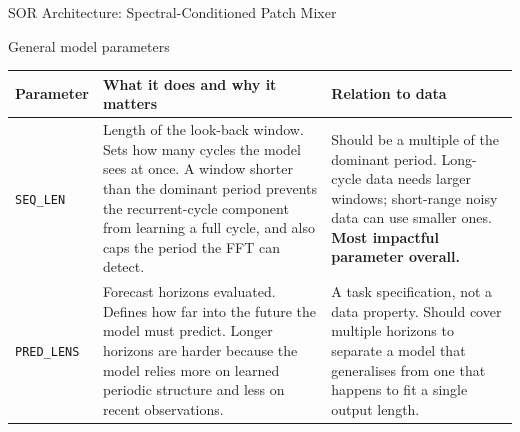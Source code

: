 \documentclass[aspectratio=169]{beamer}
\begin{document}
\begin{frame}[t]{SOR Architecture: Spectral-Conditioned Patch Mixer}
\centering
\vspace{-0.25cm}
\end{frame}



\begin{frame}{General model parameters}
\scriptsize
\setlength{\tabcolsep}{5pt}
\renewcommand{\arraystretch}{1.1}
\begin{tabular}{@{}L{2.1cm} L{5.6cm} L{5.6cm}@{}}
  \toprule
  \textbf{Parameter} & \textbf{What it does and why it matters}
                     & \textbf{Relation to data} \\
  \midrule
  \texttt{SEQ\_LEN}
    & Length of the look-back window. Sets how many cycles the model
      sees at once. A window shorter than the dominant period prevents
      the recurrent-cycle component from learning a full cycle, and
      also caps the period the FFT can detect.
    & Should be a multiple of the dominant period. Long-cycle data
      needs larger windows; short-range noisy data can use smaller
      ones. \textbf{Most impactful parameter overall.} \\
  \addlinespace
  \texttt{PRED\_LENS}
    & Forecast horizons evaluated. Defines how far into the future
      the model must predict. Longer horizons are harder because the
      model relies more on learned periodic structure and less on
      recent observations.
    & A task specification, not a data property. Should cover
      multiple horizons to separate a model that generalises from one
      that happens to fit a single output length. \\
  \bottomrule
\end{tabular}
\end{frame}
\end{document}

